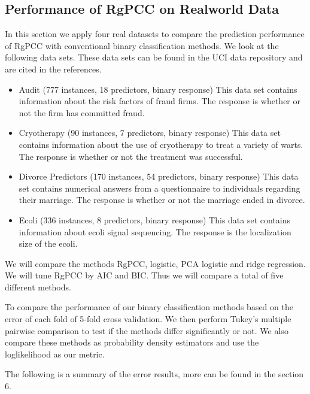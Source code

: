 \documentclass[main.tex]{subfiles}
\begin{document}
%
%
%
%
%
%
%
%
%
%
%
%
%
%
%

\subsection{Performance of RgPCC on Realworld Data}

In this section we apply four real datasets to compare the prediction performance of RgPCC with conventional binary classification methods. We look at the following data sets. These data sets can be found in the UCI data repository and are cited in the references.
\begin{itemize}
	\item Audit (777 instances, 18 predictors, binary response) This data set contains information about the risk factors of fraud firms. The response is whether or not the firm has committed fraud. \cite{audit}
    \item Cryotherapy (90 instances, 7 predictors, binary response) This data set contains information about the use of cryotherapy to treat a variety of warts. The response is whether or not the treatment was successful. \cite{cryo}
    \item Divorce Predictors (170 instances, 54 predictors, binary response) This data set contains numerical answers from a questionnaire to individuals regarding their marriage. The response is whether or not the marriage ended in divorce. \cite{divorce}
    \item Ecoli (336 instances, 8 predictors, binary response) This data set contains information about ecoli signal sequencing. The response is the localization size of the ecoli. \cite{ecoli}
\end{itemize}

We will compare the methods RgPCC, logistic, PCA logistic and ridge regression. We will tune RgPCC by AIC and BIC. Thus we will compare a total of five different methods. 

To compare the performance of our binary classification methods based on the error of each fold of 5-fold cross validation. We then perform Tukey's multiple pairwise comparison to test if the methods differ significantly or not. We also compare these methods as probability density estimators and use the loglikelihood as our metric.

The following is a summary of the error results, more can be found in the section 6.
\end{document}
